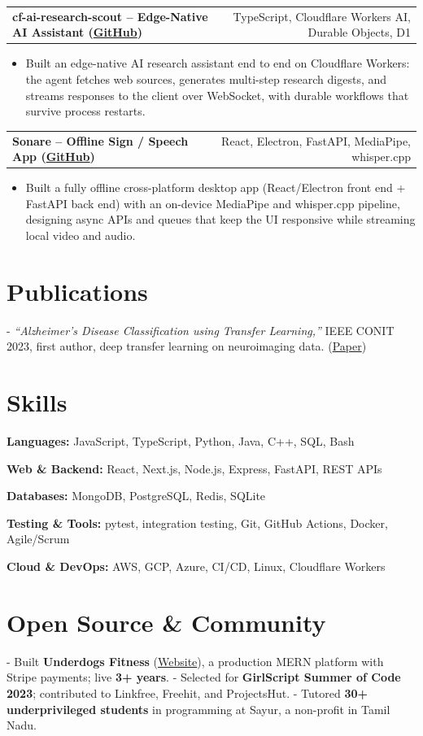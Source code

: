 \documentclass[letterpaper,11pt]{article}
\makeatletter
\newcommand{\projItem}[2]{%
  \vspace{2pt}
  \begin{tabular*}{\textwidth}{@{}l@{\extracolsep{\fill}}r@{}}
    \textbf{#1} & #2 \\
  \end{tabular*}\par\vspace{-3pt}
}
\newcommand{\skillLine}[2]{\textbf{#1:} #2\par\vspace{1.5pt}}
\newcommand{\inlineBlock}[1]{{\setlength{\leftskip}{0.18in}\small #1\par}}
\makeatother
\begin{document}
\projItem{cf-ai-research-scout -- Edge-Native AI Assistant {\normalfont\small(\href{https://github.com/Deva-1903/cf_ai_research_scout}{GitHub})}}{TypeScript, Cloudflare Workers AI, Durable Objects, D1}
\begin{itemize}
  \item Built an edge-native AI research assistant end to end on Cloudflare Workers: the agent fetches web sources, generates multi-step research digests, and streams responses to the client over WebSocket, with durable workflows that survive process restarts.
\end{itemize}

\projItem{Sonare -- Offline Sign / Speech App {\normalfont\small(\href{https://github.com/Deva-1903/Qualcomm-Sep25-Team-Sonare}{GitHub})}}{React, Electron, FastAPI, MediaPipe, whisper.cpp}
\begin{itemize}
  \item Built a fully offline cross-platform desktop app (React/Electron front end + FastAPI back end) with an on-device MediaPipe and whisper.cpp pipeline, designing async APIs and queues that keep the UI responsive while streaming local video and audio.
\end{itemize}

\section{Publications}
\vspace{2pt}
\inlineBlock{- \textit{``Alzheimer's Disease Classification using Transfer Learning,''} IEEE CONIT 2023, first author, deep transfer learning on neuroimaging data. {\normalfont\small(\href{https://ieeexplore.ieee.org/document/10205760}{Paper})}}

\section{Skills}
\skillLine{Languages}{JavaScript, TypeScript, Python, Java, C++, SQL, Bash}
\skillLine{Web \& Backend}{React, Next.js, Node.js, Express, FastAPI, REST APIs}
\skillLine{Databases}{MongoDB, PostgreSQL, Redis, SQLite}
\skillLine{Testing \& Tools}{pytest, integration testing, Git, GitHub Actions, Docker, Agile/Scrum}
\skillLine{Cloud \& DevOps}{AWS, GCP, Azure, CI/CD, Linux, Cloudflare Workers}

\section{Open Source \& Community}
\inlineBlock{- Built \textbf{Underdogs Fitness} (\href{https://www.underdogsfitness.in/}{Website}), a production MERN platform with Stripe payments; live \textbf{3+ years}. - Selected for \textbf{GirlScript Summer of Code 2023}; contributed to Linkfree, Freehit, and ProjectsHut. - Tutored \textbf{30+ underprivileged students} in programming at Sayur, a non-profit in Tamil Nadu.}
\end{document}
